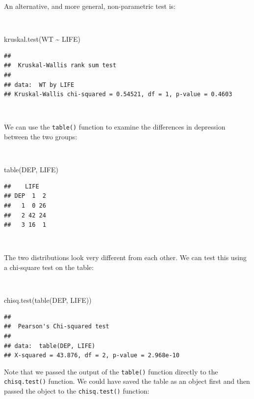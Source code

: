 \documentclass[
  12pt,
]{book}
\newenvironment{Shaded}{\begin{snugshade}}{\end{snugshade}}
\newcommand{\FunctionTok}[1]{\textcolor[rgb]{0.00,0.00,0.00}{#1}}
\newcommand{\NormalTok}[1]{#1}
\newcommand{\SpecialCharTok}[1]{\textcolor[rgb]{0.00,0.00,0.00}{#1}}
\begin{document}
\newpage

An alternative, and more general, non-parametric test is:

~

\begin{Shaded}
\begin{Highlighting}[]
\FunctionTok{kruskal.test}\NormalTok{(WT }\SpecialCharTok{\textasciitilde{}}\NormalTok{ LIFE)}
\end{Highlighting}
\end{Shaded}

\begin{verbatim}
## 
##  Kruskal-Wallis rank sum test
## 
## data:  WT by LIFE
## Kruskal-Wallis chi-squared = 0.54521, df = 1, p-value = 0.4603
\end{verbatim}

~

We can use the \texttt{table()} function to examine the differences in depression between the two groups:

~

\begin{Shaded}
\begin{Highlighting}[]
\FunctionTok{table}\NormalTok{(DEP, LIFE)}
\end{Highlighting}
\end{Shaded}

\begin{verbatim}
##    LIFE
## DEP  1  2
##   1  0 26
##   2 42 24
##   3 16  1
\end{verbatim}

~

The two distributions look very different from each other. We can test this using a chi-square test on the table:

~

\begin{Shaded}
\begin{Highlighting}[]
\FunctionTok{chisq.test}\NormalTok{(}\FunctionTok{table}\NormalTok{(DEP, LIFE))}
\end{Highlighting}
\end{Shaded}

\begin{verbatim}
## 
##  Pearson's Chi-squared test
## 
## data:  table(DEP, LIFE)
## X-squared = 43.876, df = 2, p-value = 2.968e-10
\end{verbatim}

\newpage

Note that we passed the output of the \texttt{table()} function directly to the \texttt{chisq.test()} function. We could have saved the table as an object first and then passed the object to the \texttt{chisq.test()} function:
\end{document}
